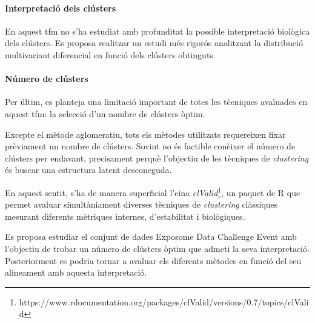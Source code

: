 \documentclass[CAT,BIB]{TFUOC}%
\begin{document}
        \paragraph{Interpretació dels clústers}
            En aquest \gls{tfm} no s'ha estudiat amb profunditat
            la possible interpretació biològica dels clústers.
            Es proposa realitzar un estudi més rigorós
            analitzant la distribució multivariant diferencial en funció dels clústers obtinguts.

        \paragraph{Número de clústers}
            Per últim,
            es planteja una limitació important de totes les tècniques avaluades
            en aquest \gls{tfm}:
            la selecció d'un nombre de clústers òptim.

            Excepte el mètode aglomeratiu,
            tots els mètodes utilitzats requereixen fixar prèviament un nombre de clústers.
            Sovint no és factible conèixer el número de clústers per endavant,
            precisament perquè l'objectiu de les tècniques de \textit{clustering}
            és buscar una estructura latent desconeguda.

            En aquest sentit, s'ha de manera superficial l'eina \textit{clValid}\footnote{https://www.rdocumentation.org/packages/clValid/versions/0.7/topics/clValid},
            un paquet de R que permet avaluar simultàniament
            diverses tècniques de \textit{clustering} clàssiques
            mesurant diferents mètriques internes, d'estabilitat i biològiques.

            Es proposa estudiar el conjunt de dades Exposome Data Challenge Event
            amb l'objectiu de trobar un número de clústers òptim
            que admeti la seva interpretació.
            Posteriorment es podria tornar a avaluar els diferents mètodes
            en funció del seu alineament amb aquesta interpretació.
\end{document}
